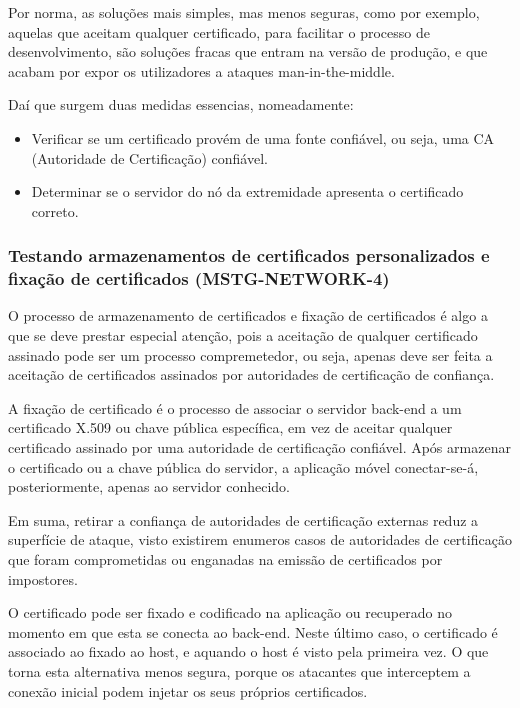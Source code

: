 \par Por norma, as soluções mais simples, mas menos seguras, como por exemplo, aquelas que aceitam qualquer certificado, para facilitar o processo de desenvolvimento, são soluções fracas que entram na versão de produção, e que acabam por expor os utilizadores a ataques man-in-the-middle.

\par Daí que surgem duas medidas essencias, nomeadamente:
\begin{itemize}
    \item Verificar se um certificado provém de uma fonte confiável, ou seja, uma CA (Autoridade de Certificação) confiável.
    \item Determinar se o servidor do nó da extremidade apresenta o certificado correto.
\end{itemize}




\subsubsection{Testando armazenamentos de certificados personalizados e fixação de certificados (MSTG-NETWORK-4)}
\par O processo de armazenamento de certificados e fixação de certificados é algo a que se deve prestar especial atenção, pois a aceitação de qualquer certificado assinado pode ser um processo compremetedor, ou seja, apenas deve ser feita a aceitação de certificados assinados por autoridades de certificação de confiança.

\par A fixação de certificado é o processo de associar o servidor back-end a um certificado X.509 ou chave pública específica, em vez de aceitar qualquer certificado assinado por uma autoridade de certificação confiável. Após armazenar o certificado ou a chave pública do servidor, a aplicação móvel conectar-se-á, posteriormente, apenas ao servidor conhecido. 

\par Em suma, retirar a confiança de autoridades de certificação externas reduz a superfície de ataque, visto existirem enumeros casos de autoridades de certificação que foram comprometidas ou enganadas na emissão de certificados por impostores.

\par O certificado pode ser fixado e codificado na aplicação ou recuperado no momento em que esta se conecta ao back-end. Neste último caso, o certificado é associado ao fixado ao host, e aquando o host é visto pela primeira vez. O que torna esta alternativa menos segura, porque os atacantes que interceptem a conexão inicial podem injetar os seus próprios certificados.






